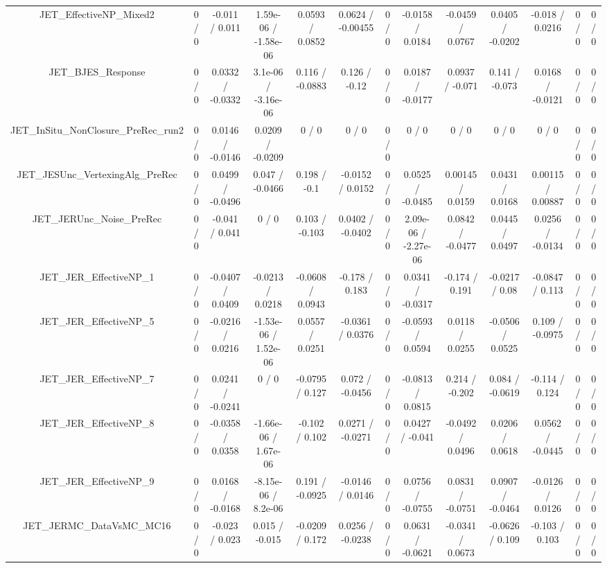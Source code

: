 \documentclass[10pt]{article}
\begin{document}
\begin{table}[htbp]
\begin{center}
\begin{tabular}{|c|c|c|c|c|c|c|c|c|c|c|c|c|}
  JET_EffectiveNP_Mixed2 & 0 / 0 & -0.011 / 0.011 & 1.59e-06 / -1.58e-06 & 0.0593 / 0.0852 & 0.0624 / -0.00455 & 0 / 0 & -0.0158 / 0.0184 & -0.0459 / 0.0767 & 0.0405 / -0.0202 & -0.018 / 0.0216 & 0 / 0 & 0 / 0 \\ 
  JET_BJES_Response & 0 / 0 & 0.0332 / -0.0332 & 3.1e-06 / -3.16e-06 & 0.116 / -0.0883 & 0.126 / -0.12 & 0 / 0 & 0.0187 / -0.0177 & 0.0937 / -0.071 & 0.141 / -0.073 & 0.0168 / -0.0121 & 0 / 0 & 0 / 0 \\ 
  JET_InSitu_NonClosure_PreRec_run2 & 0 / 0 & 0.0146 / -0.0146 & 0.0209 / -0.0209 & 0 / 0 & 0 / 0 & 0 / 0 & 0 / 0 & 0 / 0 & 0 / 0 & 0 / 0 & 0 / 0 & 0 / 0 \\ 
  JET_JESUnc_VertexingAlg_PreRec & 0 / 0 & 0.0499 / -0.0496 & 0.047 / -0.0466 & 0.198 / -0.1 & -0.0152 / 0.0152 & 0 / 0 & 0.0525 / -0.0485 & 0.00145 / 0.0159 & 0.0431 / 0.0168 & 0.00115 / 0.00887 & 0 / 0 & 0 / 0 \\ 
  JET_JERUnc_Noise_PreRec & 0 / 0 & -0.041 / 0.041 & 0 / 0 & 0.103 / -0.103 & 0.0402 / -0.0402 & 0 / 0 & 2.09e-06 / -2.27e-06 & 0.0842 / -0.0477 & 0.0445 / 0.0497 & 0.0256 / -0.0134 & 0 / 0 & 0 / 0 \\ 
  JET_JER_EffectiveNP_1 & 0 / 0 & -0.0407 / 0.0409 & -0.0213 / 0.0218 & -0.0608 / 0.0943 & -0.178 / 0.183 & 0 / 0 & 0.0341 / -0.0317 & -0.174 / 0.191 & -0.0217 / 0.08 & -0.0847 / 0.113 & 0 / 0 & 0 / 0 \\ 
  JET_JER_EffectiveNP_5 & 0 / 0 & -0.0216 / 0.0216 & -1.53e-06 / 1.52e-06 & 0.0557 / 0.0251 & -0.0361 / 0.0376 & 0 / 0 & -0.0593 / 0.0594 & 0.0118 / 0.0255 & -0.0506 / 0.0525 & 0.109 / -0.0975 & 0 / 0 & 0 / 0 \\ 
  JET_JER_EffectiveNP_7 & 0 / 0 & 0.0241 / -0.0241 & 0 / 0 & -0.0795 / 0.127 & 0.072 / -0.0456 & 0 / 0 & -0.0813 / 0.0815 & 0.214 / -0.202 & 0.084 / -0.0619 & -0.114 / 0.124 & 0 / 0 & 0 / 0 \\ 
  JET_JER_EffectiveNP_8 & 0 / 0 & -0.0358 / 0.0358 & -1.66e-06 / 1.67e-06 & -0.102 / 0.102 & 0.0271 / -0.0271 & 0 / 0 & 0.0427 / -0.041 & -0.0492 / 0.0496 & 0.0206 / 0.0618 & 0.0562 / -0.0445 & 0 / 0 & 0 / 0 \\ 
  JET_JER_EffectiveNP_9 & 0 / 0 & 0.0168 / -0.0168 & -8.15e-06 / 8.2e-06 & 0.191 / -0.0925 & -0.0146 / 0.0146 & 0 / 0 & 0.0756 / -0.0755 & 0.0831 / -0.0751 & 0.0907 / -0.0464 & -0.0126 / 0.0126 & 0 / 0 & 0 / 0 \\ 
  JET_JERMC_DataVsMC_MC16 & 0 / 0 & -0.023 / 0.023 & 0.015 / -0.015 & -0.0209 / 0.172 & 0.0256 / -0.0238 & 0 / 0 & 0.0631 / -0.0621 & -0.0341 / 0.0673 & -0.0626 / 0.109 & -0.103 / 0.103 & 0 / 0 & 0 / 0 \\ 

\end{tabular}
\end{center}
\end{table}
\end{document}

